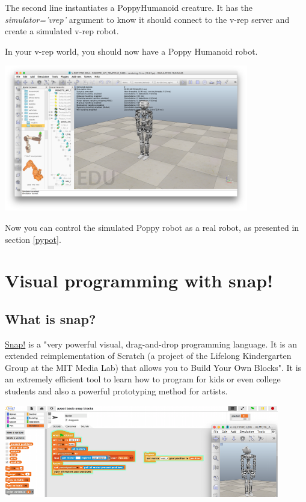 \documentclass{article}
\begin{document}
The second line instantiates a PoppyHumanoid creature. It has the \textit{simulator='vrep'} argument to know it should connect to the v-rep server and create a simulated v-rep robot.

In your v-rep world, you should now have a Poppy Humanoid robot.

 \begin{center}
  \includegraphics[width=0.8\textwidth]{img/vrep-poppy}
 \end{center}
   
Now you can control the simulated Poppy robot as a real robot, as presented in section \ref{pypot}.



\section{Visual programming with snap!}
\label{programming-with-snap}

\subsection{What is snap?}

\href{http://snap.berkeley.edu/}{Snap!} is a "very powerful visual, drag-and-drop programming language. It is an extended reimplementation of Scratch (a project of the Lifelong Kindergarten Group at the MIT Media Lab) that allows you to Build Your Own Blocks". It is an extremely efficient tool to learn how to program for kids or even college students and also a powerful prototyping method for artists.

 \begin{center}
  \includegraphics[width=0.9\textwidth]{img/snap-header}
 \end{center}
\end{document}
